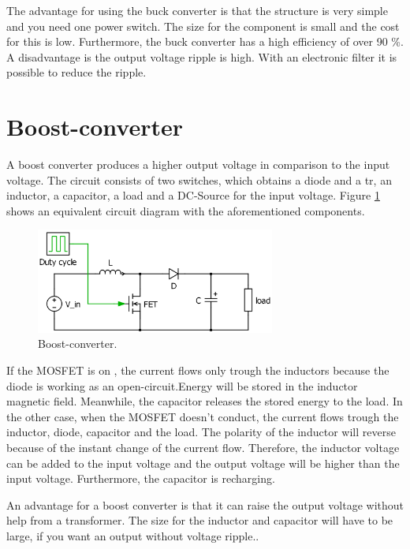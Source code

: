 The advantage for using the buck converter is that the structure is very simple and you need one power switch. The size for the component is small and the cost for this is low. Furthermore, the buck converter has a high efficiency of over 90 \%\cite{Efficiencybuck}. A disadvantage  is the output voltage ripple is high. With an electronic filter it is possible to reduce the ripple\cite{advantagebuck}.

\section{Boost-converter\label{Boost-C}}

A boost converter produces a higher output voltage in comparison to the input voltage. The circuit consists of two switches, which obtains a diode and a tr, an inductor, a capacitor, a load and a DC-Source for the input voltage. Figure \ref{Boost-converter} shows an equivalent circuit diagram with the aforementioned components. %

\begin{figure}[htbp]
	\begin{center}
		\includegraphics[width=0.7\textwidth]{../Pictures/Boost-converter}
		\caption{Boost-converter.}
		\label{Boost-converter}
	\end{center}	
\end{figure}

If the MOSFET is on , the current flows only trough the inductors because the diode  is working as an open-circuit.Energy will be stored in the inductor magnetic field. Meanwhile, the capacitor releases the stored energy to the load.%
In the other case, when the MOSFET doesn’t conduct, the current flows trough the inductor, diode, capacitor and the load. The polarity of the inductor will reverse because of the instant change of the current flow.%
Therefore, the inductor voltage can be added to the input voltage and the output voltage will be higher than the input voltage. Furthermore, the capacitor is recharging\cite{schematicbuckandboost}.

An advantage for a boost converter is that it can raise the output voltage without help from a transformer. The size for the inductor and capacitor will have to be large, if you want an output without voltage ripple.\cite{advantageboost}. %
 
